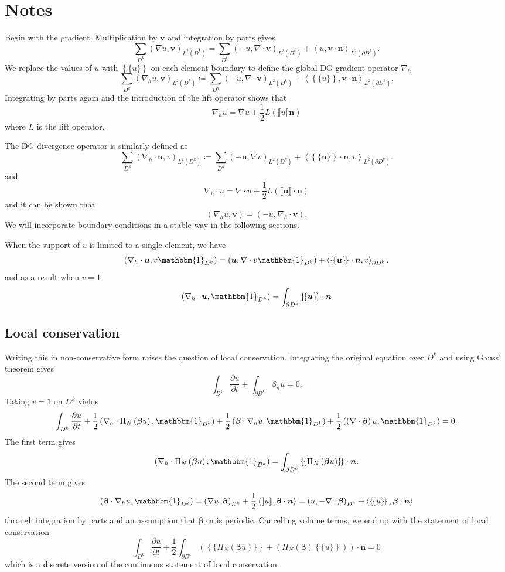 \documentclass[preprint,10pt]{article}
\theoremstyle{definition}
\theoremstyle{lemma}
\newcommand{\bbm}[1]{\mathbbm{#1}}
\newcommand{\pd}[2]{\frac{\partial#1}{\partial#2}}
\newcommand{\LRp}[1]{\left( #1 \right)}
\newcommand{\LRa}[1]{\left\langle #1 \right\rangle}
\newcommand{\LRc}[1]{\left\{ #1 \right\}}
\newcommand{\Grad} {\ensuremath{\nabla}}
\newcommand{\jump}[1] {\ensuremath{\llbracket#1\rrbracket}}
\newcommand{\avg}[1] {\ensuremath{\LRc{\!\{#1\}\!}}}
\newcommand{\LK}{L^2\LRp{D^k}}
\newcommand{\LdK}{L^2\LRp{\partial D^k}}
\begin{document}
\section{Notes}
Begin with the gradient.  Multiplication by $\bm{v}$ and integration by parts gives
\[
\sum_{D^k} \LRp{\Grad u, \bm{v}}_{\LK} = \sum_{D^k} \LRp{-u, \Grad \cdot \bm{v}}_{\LK} + \LRa{u,\bm{v}\cdot\bm{n}}_{\LdK}.
\]
We replace the values of ${u}$ with $\avg{u}$ on each element boundary to define the global DG gradient operator $\Grad_h$ 
\[
\sum_{D^k} \LRp{\Grad_h u, \bm{v}}_{\LK} \coloneqq \sum_{D^k} \LRp{-u, \Grad \cdot \bm{v}}_{\LK} + \LRa{\avg{u},\bm{v}\cdot\bm{n}}_{\LdK}.
\]
Integrating by parts again and the introduction of the lift operator shows that
\[
\Grad_h u = \Grad u + \frac{1}{2}L\LRp{\jump{u}\bm{n}}
\]
where $L$ is the lift operator.  

The DG divergence operator is similarly defined as
\[
\sum_{D^k} \LRp{\Grad_h \cdot \bm{u}, v}_{\LK} \coloneqq \sum_{D^k} \LRp{-\bm{u}, \Grad v}_{\LK} + \LRa{\avg{\bm{u}}\cdot\bm{n},v}_{\LdK}.
\]
and
\[
\Grad_h \cdot u = \Grad\cdot u + \frac{1}{2}L\LRp{\jump{\bm{u}}\cdot\bm{n}}
\]
and it can be shown that 
\[
\LRp{\Grad_h u, \bm{v}} = \LRp{-u, \Grad_h \cdot \bm{v}}.
\]
We will incorporate boundary conditions in a stable way in the following sections.  

When the support of $v$ is limited to a single element, we have
\[
\LRp{\Grad_h\cdot \bm{u},v\bbm{1}_{D^k}} = \LRp{\bm{u}, \Grad\cdot v\bbm{1}_{D^k}}  + \LRa{\avg{\bm{u}}\cdot\bm{n},v}_{\partial D^k}.
\]
and as a result when $v = 1$
\[
\LRp{\Grad_h\cdot \bm{u},\bbm{1}_{D^k}} = \int_{\partial D^k}\avg{\bm{u}}\cdot\bm{n}
\]

\subsection{Local conservation}

Writing this in non-conservative form raises the question of local conservation.  Integrating the original equation over $D^k$ and using Gauss' theorem gives
\[
\int_{D^k}\pd{u}{t} + \int_{\partial D^k} \beta_n u = 0.
\]
Taking $v = 1$ on $D^k$ yields
\[
\int_{D^k}\pd{u}{t} + \frac{1}{2}\LRp{\Grad_h\cdot \Pi_N \LRp{ \bm{\beta}u},\bbm{1}_{D^k}} + \frac{1}{2}\LRp{\bm{\beta}\cdot\Grad_h u,\bbm{1}_{D^k}} + \frac{1}{2}\LRp{\LRp{\Grad\cdot \bm{\beta}} u,\bbm{1}_{D^k}} = 0.
\]
The first term gives
\[
\LRp{\Grad_h\cdot \Pi_N \LRp{ \bm{\beta}u},\bbm{1}_{D^k}} = \int_{\partial D^k} \avg{\Pi_N\LRp{\bm{\beta}u}}\cdot\bm{n}.
\]
The second term gives
\[
\LRp{\bm{\beta}\cdot\Grad_h u,\bbm{1}_{D^k}} = \LRp{\Grad u,\bm{\beta}}_{D^k} + \frac{1}{2}\LRa{\jump{u},\bm{\beta}\cdot\bm{n}} = \LRp{u,-\Grad \cdot \bm{\beta}}_{D^k} + \LRa{\avg{u},\bm{\beta}\cdot\bm{n}}
\]
through integration by parts and an assumption that $\bm{\beta}\cdot \bm{n}$ is periodic.  Cancelling volume terms, we end up with the statement of local conservation 
\[
\int_{D^k} \pd{u}{t}  + \frac{1}{2}\int_{\partial D^k} \LRp{\avg{\Pi_N\LRp{\bm{\beta}u}} + \LRp{\Pi_N\LRp{\bm{\beta}}\avg{u}}}\cdot\bm{n} = 0
\]
which is a discrete version of the continuous statement of local conservation.
\end{document}

